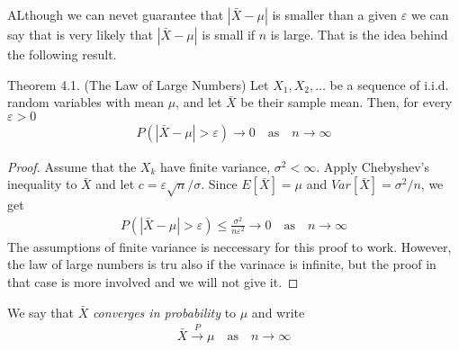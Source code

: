 ALthough we can nevet guarantee that $|\bar{X} - \mu|$ is smaller than a given $\varepsilon$ we can say that is very likely that $|\bar{X} - \mu|$ is small if $n$ is large. That is the idea behind the following result.
\begin{boks}{Theorem 4.1. (The Law of Large Numbers)}
  Let $X_1, X_2, \ldots$ be a sequence of i.i.d. random variables with mean $\mu$, and let $\bar{X}$ be their sample mean. Then, for every $\varepsilon > 0$
  \begin{align*}
    P(|\bar{X} - \mu| > \varepsilon) \rightarrow 0 \quad
    \text{as} \quad n \rightarrow \infty
  \end{align*}
\end{boks}
\begin{proof}
  Assume that the $X_k$ have finite variance, $\sigma^2 < \infty$.
  Apply Chebyshev's inequality to $\bar{X}$ and let $c = \varepsilon \sqrt{n}/\sigma$.
  Since $E[\bar{X}] = \mu$ and $Var[\bar{X}] = \sigma^2/n$, we get
  \begin{align*}
    P(|\bar{X} - \mu| > \varepsilon) \leq \frac{\sigma^2}{n\varepsilon^2} \rightarrow 0 \quad
    \text{as} \quad n \rightarrow \infty
  \end{align*}
The assumptions of finite variance is neccessary for this proof to work. However, the law of large numbers is tru also if the varinace is infinite, but the proof in that case is more involved and we will not give it.
\end{proof}
We say that $\bar{X}$ \textit{converges in probability} to $\mu$ and write
\begin{align*}
  \bar{X} \xrightarrow{P} \mu \quad \text{as} \quad n \rightarrow \infty
\end{align*}

